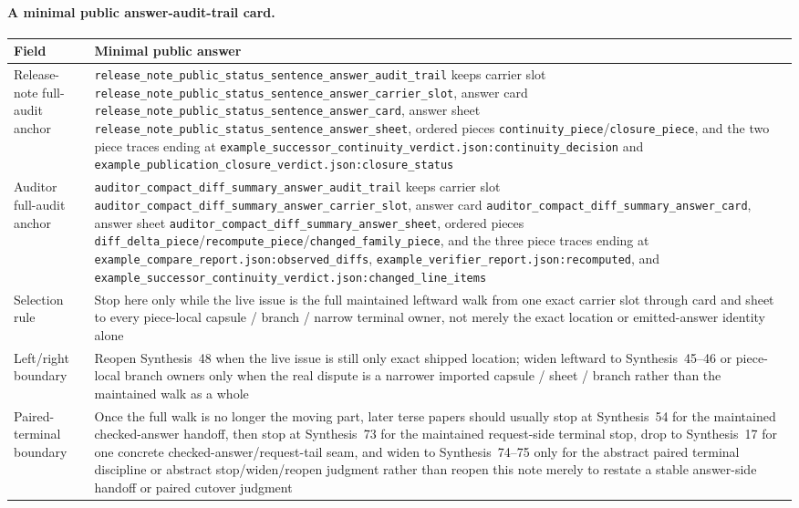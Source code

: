 \documentclass[11pt]{article}
\begin{document}
\paragraph{A minimal public answer-audit-trail card.}
\begin{table}[t]
\centering
\small
\begin{tabularx}{\linewidth}{@{}lX@{}}
\toprule
Field & Minimal public answer \\
\midrule
Release-note full-audit anchor & \nolinkurl{release_note_public_status_sentence_answer_audit_trail} keeps carrier slot \nolinkurl{release_note_public_status_sentence_answer_carrier_slot}, answer card \nolinkurl{release_note_public_status_sentence_answer_card}, answer sheet \nolinkurl{release_note_public_status_sentence_answer_sheet}, ordered pieces \nolinkurl{continuity_piece}/\nolinkurl{closure_piece}, and the two piece traces ending at \nolinkurl{example_successor_continuity_verdict.json:continuity_decision} and \nolinkurl{example_publication_closure_verdict.json:closure_status} \\
Auditor full-audit anchor & \nolinkurl{auditor_compact_diff_summary_answer_audit_trail} keeps carrier slot \nolinkurl{auditor_compact_diff_summary_answer_carrier_slot}, answer card \nolinkurl{auditor_compact_diff_summary_answer_card}, answer sheet \nolinkurl{auditor_compact_diff_summary_answer_sheet}, ordered pieces \nolinkurl{diff_delta_piece}/\nolinkurl{recompute_piece}/\nolinkurl{changed_family_piece}, and the three piece traces ending at \nolinkurl{example_compare_report.json:observed_diffs}, \nolinkurl{example_verifier_report.json:recomputed}, and \nolinkurl{example_successor_continuity_verdict.json:changed_line_items} \\
Selection rule & Stop here only while the live issue is the full maintained leftward walk from one exact carrier slot through card and sheet to every piece-local capsule / branch / narrow terminal owner, not merely the exact location or emitted-answer identity alone \\
Left/right boundary & Reopen Synthesis~48 when the live issue is still only exact shipped location; widen leftward to Synthesis~45--46 or piece-local branch owners only when the real dispute is a narrower imported capsule / sheet / branch rather than the maintained walk as a whole \\
Paired-terminal boundary & Once the full walk is no longer the moving part, later terse papers should usually stop at Synthesis~54 for the maintained checked-answer handoff, then stop at Synthesis~73 for the maintained request-side terminal stop, drop to Synthesis~17 for one concrete checked-answer/request-tail seam, and widen to Synthesis~74--75 only for the abstract paired terminal discipline or abstract stop/widen/reopen judgment rather than reopen this note merely to restate a stable answer-side handoff or paired cutover judgment \\

\end{tabularx}
\end{table}
\end{document}
